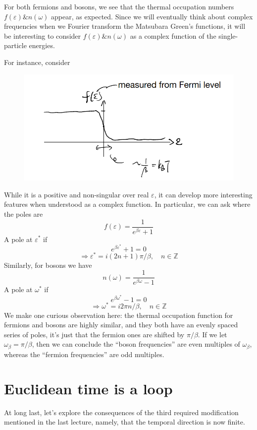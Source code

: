 For both fermions and bosons, we see that the thermal occupation numbers $f(\varepsilon) \& n(\omega)$ appear, as expected. Since we will eventually think about complex frequencies when we Fourier transform the Matsubara Green's functions, it will be interesting to consider $f(\varepsilon)\& n(\omega)$ as a complex function of the single-particle energies.

For instance, consider
\begin{figure}[H]
    \centering
    \includegraphics[width=\textwidth]{jupyterbook/data/fig/lec22-fig00.png}
\end{figure}
While it is a positive and non-singular over real $\varepsilon$, it can develop more interesting features when understood as a complex function. In particular, we can ask where the poles are
\[ f\left( \varepsilon \right) =\frac{1}{e^{\beta \varepsilon}+1}\]
A pole at $\varepsilon^*$ if
\[ e^{\beta \varepsilon ^*}+1=0\]
\[ \Rightarrow \varepsilon ^*=i\left( 2n+1 \right) \pi /\beta ,\quad n\in \mathbb{Z} \]
Similarly, for bosons we have
\[ n\left( \omega \right) =\frac{1}{e^{\beta \omega}-1}\]
A pole at $\omega^*$ if
\[ e^{\beta \omega ^*}-1=0\]
\[ \Rightarrow \omega ^*=i2\pi n/\beta ,\quad n\in \mathbb{Z} \]
We make one curious observation here: the thermal occupation function for fermions and bosons are highly similar, and they both have an evenly spaced series of poles, it's just that the fermion ones are shifted by $\pi/\beta$. If we let $\omega_\beta=\pi/\beta$, then we can conclude the ``boson frequencies'' are even multiples of $\omega_\beta$, whereas the ``fermion frequencies'' are odd multiples.

\section{Euclidean time is a loop}

At long last, let's explore the consequences of the third required modification mentioned in the last lecture, namely, that the temporal direction is now finite.

